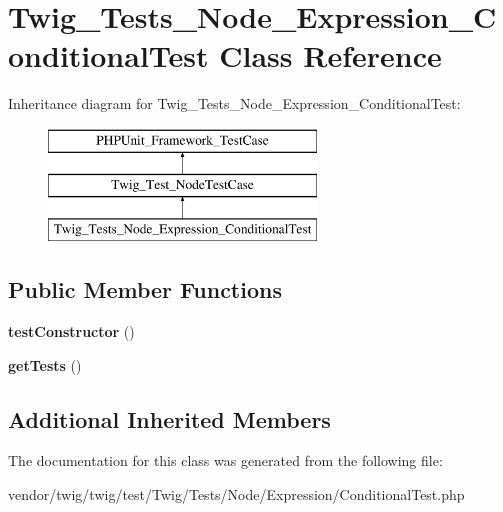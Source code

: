 \hypertarget{classTwig__Tests__Node__Expression__ConditionalTest}{}\section{Twig\+\_\+\+Tests\+\_\+\+Node\+\_\+\+Expression\+\_\+\+Conditional\+Test Class Reference}
\label{classTwig__Tests__Node__Expression__ConditionalTest}
Inheritance diagram for Twig\+\_\+\+Tests\+\_\+\+Node\+\_\+\+Expression\+\_\+\+Conditional\+Test\+:\begin{figure}[H]
\begin{center}
\leavevmode
\includegraphics[height=3.000000cm]{classTwig__Tests__Node__Expression__ConditionalTest}
\end{center}
\end{figure}
\subsection*{Public Member Functions}
\begin{DoxyCompactItemize}
\item 
{\bfseries test\+Constructor} ()\hypertarget{classTwig__Tests__Node__Expression__ConditionalTest_a7c226aa0a8ac6fe466eb1e7afce92c2d}{}\label{classTwig__Tests__Node__Expression__ConditionalTest_a7c226aa0a8ac6fe466eb1e7afce92c2d}

\item 
{\bfseries get\+Tests} ()\hypertarget{classTwig__Tests__Node__Expression__ConditionalTest_ae812550a6895104feba236237ed77017}{}\label{classTwig__Tests__Node__Expression__ConditionalTest_ae812550a6895104feba236237ed77017}

\end{DoxyCompactItemize}
\subsection*{Additional Inherited Members}


The documentation for this class was generated from the following file\+:\begin{DoxyCompactItemize}
\item 
vendor/twig/twig/test/\+Twig/\+Tests/\+Node/\+Expression/Conditional\+Test.\+php\end{DoxyCompactItemize}
